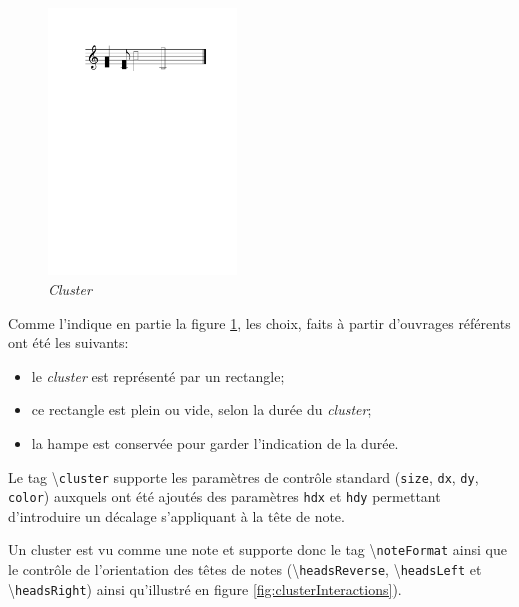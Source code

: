 \documentclass{article}
\newenvironment{gmncode}	{\vspace{-2mm}\small\verbatim}{\endverbatim\vspace{-2mm}}
\newcommand{\code}[1]		{{\small \texttt{#1}}}
\newcommand{\guidotag}[1]	{\textbackslash\code{#1}}
\begin{document}
%
\begin{figure}[h]
\centering
\begin{gmncode}
[
  \cluster({a, d} {c/8, f}
    {a/2, d2} {f/1, c1})
]
\end{gmncode}
\includegraphics[width=50mm]{img/partitions/cluster.pdf}
\caption{\emph{Cluster}}
\label{fig:cluster}
\end{figure}
%

Comme l'indique en partie la figure \ref{fig:cluster}, les choix, faits à partir d'ouvrages référents \cite{gould2011behind,stone1980music} ont été les suivants:
\begin{itemize}
	\item le \emph{cluster} est représenté par un rectangle;
	\item ce rectangle est plein ou vide, selon la durée du \emph{cluster};
	\item la hampe est conservée pour garder l'indication de la durée.
\end{itemize}

Le tag \guidotag{cluster} supporte les paramètres de contrôle standard (\code{size}, \code{dx}, \code{dy}, \code{color}) auxquels ont été ajoutés des paramètres \code{hdx} et \code{hdy} permettant d'introduire un décalage s'appliquant à la tête de note. 

Un cluster est vu comme une note et supporte donc le tag \guidotag{noteFormat} ainsi que le contrôle de l'orientation des têtes de notes (\guidotag{headsReverse}, \guidotag{headsLeft} et \guidotag{headsRight}) ainsi qu'illustré en figure \ref{fig:clusterInteractions}).
\end{document}
